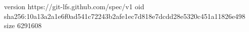 version https://git-lfs.github.com/spec/v1
oid sha256:10a13a2a1e6f0ad541c72243b2afe1ec7d818e7dcdd28e5320c451a11826e498
size 6291608
